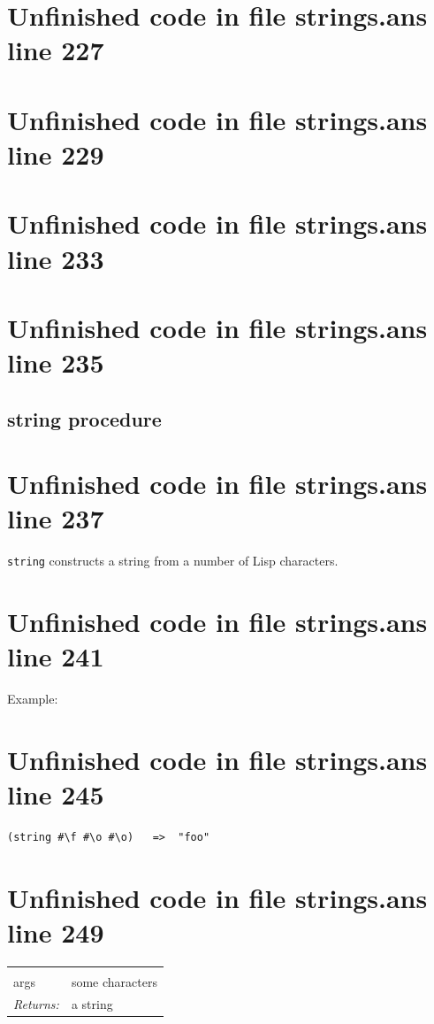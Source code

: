 \documentclass[twoside,9pt]{report}
\begin{document}
\section{Unfinished code in file strings.ans line 227}
\section{Unfinished code in file strings.ans line 229}
\section{Unfinished code in file strings.ans line 233}
\section{Unfinished code in file strings.ans line 235}
\subsection{string procedure}
\label{string-procedure}
\section{Unfinished code in file strings.ans line 237}


\texttt{string} constructs a string from a number of Lisp characters.

\section{Unfinished code in file strings.ans line 241}


Example:

\section{Unfinished code in file strings.ans line 245}
\begin{verbatim}
(string #\f #\o #\o)   =>  "foo"
\end{verbatim}
\section{Unfinished code in file strings.ans line 249}
\noindent\begin{tabular}{ |p{1.9cm} p{8cm}| }
\hline
\rowcolor[HTML]{CCCCCC} \multicolumn{2}{|l|}{\bf string (public)} \\
args & some characters \\
\textit{Returns:} & a string \\
\hline
\end{tabular}
\end{document}
